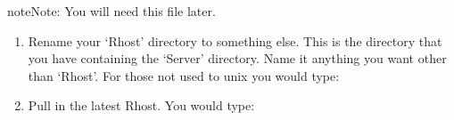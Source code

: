 \documentclass[letterpaper,10pt,english]{sphinxmanual}
\begin{document}
\begin{sphinxadmonition}{note}{Note:}
\sphinxAtStartPar
You will need this file later.
\end{sphinxadmonition}
\begin{enumerate}
%
\setcounter{enumi}{4}
\item {} 
\sphinxAtStartPar
Rename your ‘Rhost’ directory to something else.  This is the directory that you have containing the ‘Server’ directory.  Name it anything you want other than ‘Rhost’.  For those not used to unix you would type:

\begin{sphinxVerbatim}[commandchars=\\\{\}]
  
\end{sphinxVerbatim}

\item {} 
\sphinxAtStartPar
Pull in the latest Rhost.  You would type:

\begin{sphinxVerbatim}[commandchars=\\\{\}]
   
\end{sphinxVerbatim}

\end{enumerate}
\end{document}
